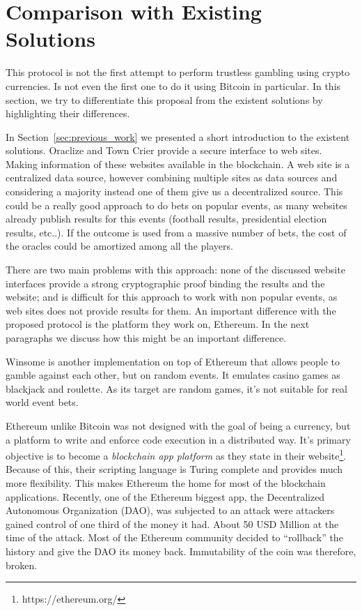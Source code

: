 \section{Comparison with Existing Solutions} \label{sec:discussion_previous_work}

This protocol is not the first attempt to perform trustless gambling using
  crypto currencies.
Is not even the first one to do it using Bitcoin in particular.
In this section, we try to differentiate this proposal from the existent
  solutions by highlighting their differences.

In Section~\ref{sec:previous_work} we presented a short introduction to the
  existent solutions.
Oraclize and Town Crier provide a secure interface to web sites.
Making information of these websites available in the blockchain.
A web site is a centralized data source, however combining multiple sites as
  data sources and considering a majority instead one of them give us a
  decentralized source.
This could be a really good approach to do bets on popular events, as
  many websites already publish results for this events (football results,
  presidential election results, etc..).
If the outcome is used from a massive number of bets, the cost of the oracles
  could be amortized among all the players.

There are two main problems with this approach: none of the discussed
  website interfaces provide a strong cryptographic proof binding the results
  and the website; and is difficult for this approach to work with non popular
  events, as web sites does not provide results for them.
An important difference with the proposed protocol is the platform they work
  on, Ethereum.
In the next paragraphs we discuss how this might be an important difference.

Winsome is another implementation on top of Ethereum that allows people to
  gamble against each other, but on random events.
It emulates casino games as blackjack and roulette.
As its target are random games, it's not suitable for real world event bets.

Ethereum unlike Bitcoin was not designed with the goal of being a currency,
  but a platform to write and enforce code execution in a distributed
  way.
It's primary objective is to become a \textit{blockchain app platform} as they
  state in their website\footnote{https://ethereum.org/}.
Because of this, their scripting language is Turing complete and provides much
  more flexibility.
This makes Ethereum the home for most of the blockchain applications.
Recently, one of the Ethereum biggest app, the Decentralized Autonomous
  Organization (DAO), was subjected to an attack were attackers gained control
  of one third of the money it had.
About 50 USD Million at the time of the attack.
Most of the Ethereum community decided to ``rollback'' the history and give the
  DAO its money back.
Immutability of the coin was therefore, broken.


